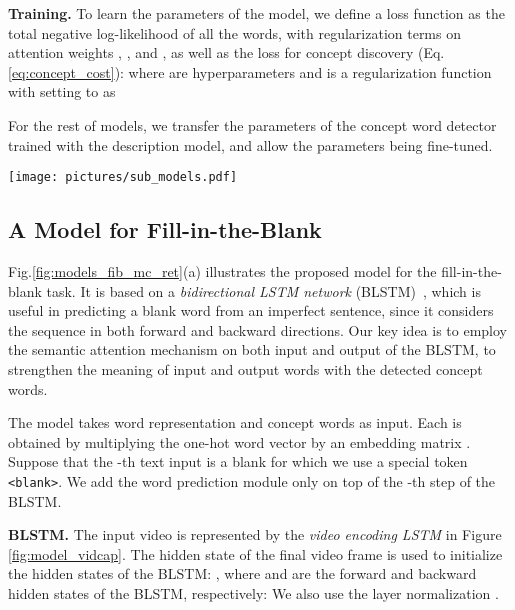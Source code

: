 \documentclass[10pt,twocolumn,letterpaper]{article}
\theoremstyle{nonumberplain}
\begin{document}
\textbf{Training.}
To learn the parameters of the model, we define a loss function as the total negative log-likelihood of all the words,
with regularization terms on attention weights
, , and  \cite{quanzeng-cvpr-2016},
as well as the loss  for concept discovery (Eq.\ref{eq:concept_cost}):
where  are hyperparameters and  is a regularization function with setting to   as


For the rest of models, we transfer the parameters of the concept word detector
trained with the description model, and allow the parameters being fine-tuned.


\begin{figure*}\centering
\texttt{[image: pictures/sub\_models.pdf]}
\vspace{5pt}
\caption{The model architectures for
    (a) fill-in-the-blank (section \ref{subsec:model_blank}),
    (b) multiple-choice, and (c) movie retrieval task. The description of models for (b)--(c) can be found in the supplementary file.
Each model takes advantage of the concept word detector in Fig.\ref{fig:model_vidcap},
and semantic attention for the sake of its objective.
}
\label{fig:models_fib_mc_ret}
\vspace{-5pt}
\end{figure*}


\subsection{A Model for Fill-in-the-Blank}
\label{subsec:model_blank}


Fig.\ref{fig:models_fib_mc_ret}(a) illustrates the proposed model for the fill-in-the-blank task.
It is based on a \textit{bidirectional LSTM network} (BLSTM)~\cite{Schuster-ieee-1997,hochreiter-ieee-1997},
which is useful in predicting a blank word from an imperfect sentence, since it considers the sequence in both forward and backward directions.
Our key idea is to employ the semantic attention mechanism on both input and output of the BLSTM,
to strengthen the meaning of input and output words with the detected concept words. 

The model takes word representation  and concept words  as input.
Each  is obtained by multiplying the one-hot word vector by an embedding matrix .
Suppose that the -th text input is a blank for which we use a special token \texttt{<blank>}.
We add the word prediction module only on top of the -th step of the BLSTM.


\textbf{BLSTM.}
The input video is represented by the \textit{video encoding LSTM} in Figure \ref{fig:model_vidcap}.
The hidden state of the final video frame  is used to
initialize the hidden states of the BLSTM:
, where
 and  are the forward and backward hidden states of the BLSTM, respectively:
We also use the layer normalization \cite{Jimmy-arxiv-2016}.
\end{document}
